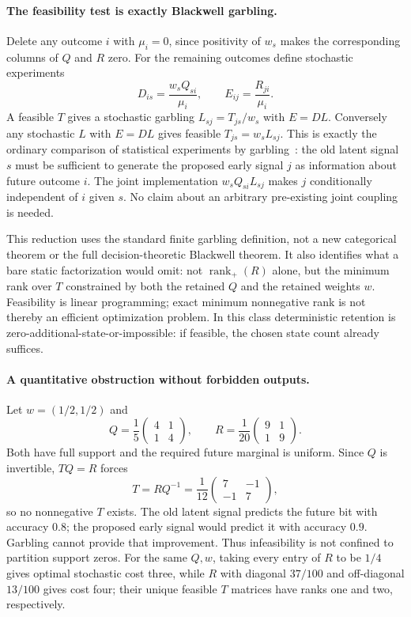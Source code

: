 \documentclass[11pt]{article}
\begin{document}
\paragraph{The feasibility test is exactly Blackwell garbling.}
Delete any outcome $i$ with $\mu_i=0$, since positivity of $w_s$ makes the corresponding columns of $Q$ and $R$ zero. For the remaining outcomes define stochastic experiments
\[
 D_{is}=\frac{w_sQ_{si}}{\mu_i},\qquad
 E_{ij}=\frac{R_{ji}}{\mu_i}.
\]
A feasible $T$ gives a stochastic garbling $L_{sj}=T_{js}/w_s$ with $E=DL$. Conversely any stochastic $L$ with $E=DL$ gives feasible $T_{js}=w_sL_{sj}$. This is exactly the ordinary comparison of statistical experiments by garbling~\cite[Section 5.1]{FGPR2023}: the old latent signal $s$ must be sufficient to generate the proposed early signal $j$ as information about future outcome $i$. The joint implementation $w_sQ_{si}L_{sj}$ makes $j$ conditionally independent of $i$ given $s$. No claim about an arbitrary pre-existing joint coupling is needed.

This reduction uses the standard finite garbling definition, not a new categorical theorem or the full decision-theoretic Blackwell theorem. It also identifies what a bare static factorization would omit: not $\operatorname{rank}_+(R)$ alone, but the minimum rank over $T$ constrained by both the retained $Q$ and the retained weights $w$. Feasibility is linear programming; exact minimum nonnegative rank is not thereby an efficient optimization problem. In this class deterministic retention is zero-additional-state-or-impossible: if feasible, the chosen state count already suffices.

\paragraph{A quantitative obstruction without forbidden outputs.}
Let $w=(1/2,1/2)$ and
\[
 Q=\frac15\begin{pmatrix}4&1\\1&4\end{pmatrix},
 \qquad R=\frac1{20}\begin{pmatrix}9&1\\1&9\end{pmatrix}.
\]
Both have full support and the required future marginal is uniform. Since $Q$ is invertible, $TQ=R$ forces
\[
 T=RQ^{-1}=\frac1{12}\begin{pmatrix}7&-1\\-1&7\end{pmatrix},
\]
so no nonnegative $T$ exists. The old latent signal predicts the future bit with accuracy $0.8$; the proposed early signal would predict it with accuracy $0.9$. Garbling cannot provide that improvement. Thus infeasibility is not confined to partition support zeros. For the same $Q,w$, taking every entry of $R$ to be $1/4$ gives optimal stochastic cost three, while $R$ with diagonal $37/100$ and off-diagonal $13/100$ gives cost four; their unique feasible $T$ matrices have ranks one and two, respectively.
\end{document}
